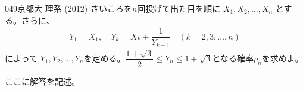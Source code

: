 \begin{thm}{049}{\maru}{京都大 理系 (2012)}
 さいころを$n$回投げて出た目を順に $X_1, X_2, \ldots, X_n$ とする。さらに、
 \begin{align*}
  Y_1=X_1,\quad Y_k=X_k+\dfrac{1}{Y_{k-1}} \quad (k=2,3,\ldots, n)
 \end{align*}
 によって $Y_1, Y_2, \ldots, Y_n$を定める。$\dfrac{1+\sqrt{3}}{2}\le Y_n \le 1+\sqrt{3}$となる確率$p_n$を求めよ。
\end{thm}

ここに解答を記述。